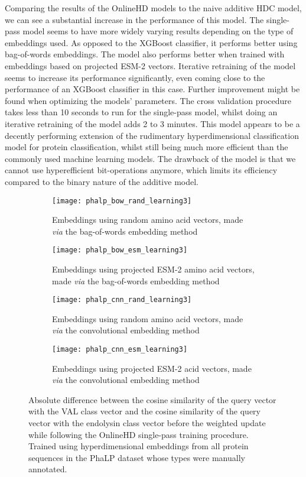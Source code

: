 Comparing the results of the OnlineHD models to the naive additive HDC model, we can see a substantial increase in the performance of this model. The single-pass model seems to have more widely varying results depending on the type of embeddings used. As opposed to the XGBoost classifier, it performs better using bag-of-words embeddings. The model also performs better when trained with embeddings based on projected ESM-2 vectors. Iterative retraining of the model seems to increase its performance significantly, even coming close to the performance of an XGBoost classifier in this case. Further improvement might be found when optimizing the models' parameters. The cross validation procedure takes less than 10 seconds to run for the single-pass model, whilst doing an iterative retraining of the model adds 2 to 3 minutes. This model appears to be a decently performing extension of the rudimentary hyperdimensional classification model for protein classification, whilst still being much more efficient than the commonly used machine learning models. The drawback of the model is that we cannot use hyperefficient bit-operations anymore, which limits its efficiency compared to the binary nature of the additive model.

\begin{figure}[h!]
    \centering
    \begin{subfigure}{0.48\textwidth}
        \texttt{[image: phalp\_bow\_rand\_learning3]}
        \caption{Embeddings using random amino acid vectors, made \textit{via} the bag-of-words embedding method}
        \label{fig:subfig-a2}
    \end{subfigure}
    \hfill
    \begin{subfigure}{0.48\textwidth}
        \texttt{[image: phalp\_bow\_esm\_learning3]}
        \caption{Embeddings using projected ESM-2 amino acid vectors, made \textit{via} the bag-of-words embedding method}
        \label{fig:subfig-b2}
    \end{subfigure}
    
    \begin{subfigure}{0.48\textwidth}
        \texttt{[image: phalp\_cnn\_rand\_learning3]}
        \caption{Embeddings using random amino acid vectors, made \textit{via} the convolutional embedding method}
        \label{fig:subfig-c2}
    \end{subfigure}
    \hfill
    \begin{subfigure}{0.48\textwidth}
        \texttt{[image: phalp\_cnn\_esm\_learning3]}
        \caption{Embeddings using projected ESM-2 acid vectors, made \textit{via} the convolutional embedding method}
        \label{fig:subfig-d2}
    \end{subfigure}
    \caption{Absolute difference between the cosine similarity of the query vector with the VAL class vector and the cosine similarity of the query vector with the endolysin class vector before the weighted update while following the OnlineHD single-pass training procedure. Trained using hyperdimensional embeddings from all protein sequences in the PhaLP dataset whose types were manually annotated.}
    \label{fig:main2}
\end{figure}

